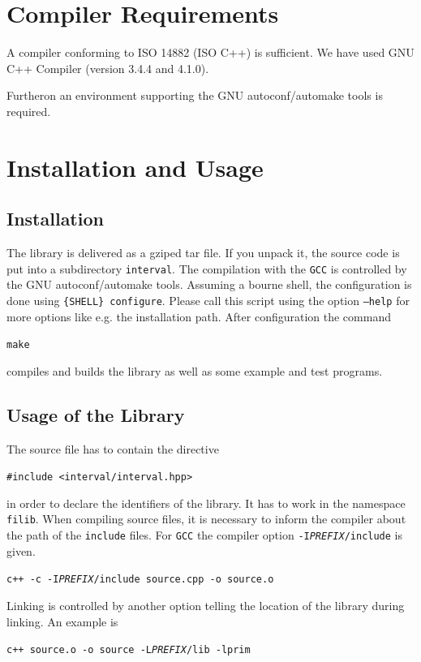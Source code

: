 \documentclass{report}
\begin{document}
		\section{Compiler Requirements}
		A compiler conforming to ISO 14882 (ISO C++) is sufficient. We have used
		GNU C++ Compiler (version 3.4.4 and 4.1.0).\par
		Furtheron an environment supporting the GNU autoconf/automake tools is required.
		
		\section{Installation and Usage}

		\subsection{Installation }
		The library is delivered as a gziped tar file. If you unpack it, the source
		code is put into a subdirectory 
		\texttt{interval}. The compilation with the  \texttt{GCC}
		is controlled by the GNU autoconf/automake tools.
		Assuming a bourne shell, the configuration
		is done using \texttt{\{SHELL\} configure}.
		Please call this script using the option
		\texttt{--help} for more options like e.g.
		the installation path.
		After configuration  the command
		\begin{center}
			\texttt{make}
		\end{center}
		compiles and builds the library as well as some example and test programs.

	\subsection{Usage of the Library}
		The source file has to contain the directive
		\begin{center}
		\texttt{\#include <interval/interval.hpp>}
		\end{center}
		in order to declare the identifiers of the library. It has to work in the
		namespace \texttt{filib}.
		When compiling source files, it is necessary to inform the
		compiler about the path of the  \texttt{include} files.
		For \texttt{GCC} the compiler option
		\texttt{-I\textit{PREFIX}/include} is given.
		\begin{center}
			\texttt{c++ -c -I\textit{PREFIX}/include source.cpp -o source.o}
		\end{center}
		Linking is controlled by another option telling the location of the library
		during linking. An example is
		\begin{center}
			\texttt{c++ source.o -o source -L\textit{PREFIX}/lib -lprim}
		\end{center}
	
\end{document}
